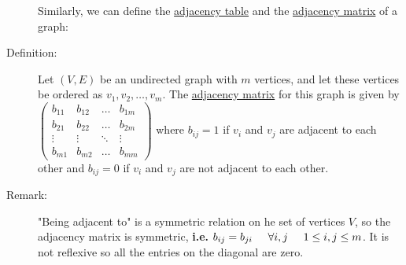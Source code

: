 \documentclass[10pt]{article}
\begin{document}
\begin{description}
			Similarly, we can define the \underline{adjacency table} and the \underline{adjacency matrix} of a graph:
			\item[Definition:] Let $(V,E)$ be an undirected graph with $m$ vertices, and let these vertices be ordered as $v_1, v_2, \dots, v_m$. The \underline{adjacency matrix} for this graph is given by $\left( \begin{array}{cccc}
			b_{11} & b_{12} & \dots & b_{1m} \\
			b_{21} & b_{22} & \dots & b_{2m} \\
			\vdots & \vdots & \ddots & \vdots \\
			b_{m1} & b_{m2} & \dots & b_{mm} \end{array} \right)$ where $b_{ij}=1$ if $v_i$ and $v_j$ are adjacent to each other and $b_{ij}=0$ if $v_i$ and $v_j$ are not adjacent to each other.
			\item[Remark:] "Being adjacent to" is a symmetric relation on he set of vertices $V$, so the adjacency matrix is symmetric, \textbf{i.e.} $b_{ij}=b_{ji} \hspace{5mm} \forall i, j \hspace{5mm} 1 \leq i, j \leq m$. It is not reflexive so all the entries on the diagonal are zero.
	\end{description}
	
\end{document}
